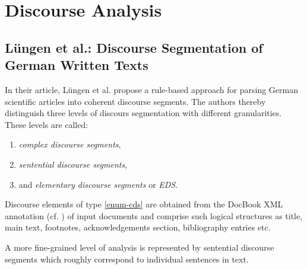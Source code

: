 \documentclass[a4paper,11pt]{article}
\begin{document}
\section{Discourse Analysis}

\subsection{L\"ungen et al.: Discourse Segmentation of German Written Texts\cite{Luengen-06}}

In their article, L\"ungen et al. \cite{Luengen-06} propose a rule-based
approach for parsing German scientific articles into coherent discourse
segments.  The authors thereby distinguish three levels of discours
segmentation with different granularities.  These levels are called:
\begin{enumerate}
  \item \textit{complex discourse segments},\label{enum-cds}
  \item \textit{sentential discourse segments},\label{enum-sds}
  \item and \textit{elementary discourse segments} or \textit{EDS}.\label{enum-eds}
\end{enumerate}

Discourse elements of type \ref{enum-cds} are obtained from the DocBook XML
annotation (cf. \cite{Walsh-99}) of input documents and comprise such logical
structures as title, main text, footnotes, acknowledgements section,
bibliography entries etc.

A more fine-grained level of analysis is represented by sentential discourse
segments which roughly correspond to individual sentences in text.
\end{document}
